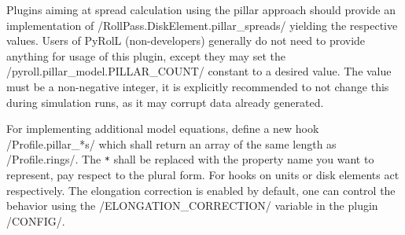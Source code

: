 \documentclass[11pt]{PyRollDocs}
\begin{document}
    Plugins aiming at spread calculation using the pillar approach should provide an implementation of \py/RollPass.DiskElement.pillar_spreads/ yielding the respective values.
    Users of PyRolL (non-developers) generally do not need to provide anything for usage of this plugin, except they may set the \py/pyroll.pillar_model.PILLAR_COUNT/ constant to a desired value.
    The value must be a non-negative integer, it is explicitly recommended to not change this during simulation runs, as it may corrupt data already generated.

    For implementing additional model equations, define a new hook \py/Profile.pillar_*s/ which shall return an array of the same length as \py/Profile.rings/.
    The \texttt{*} shall be replaced with the property name you want to represent, pay respect to the plural form.
    For hooks on units or disk elements act respectively.
    The elongation correction is enabled by default, one can control the behavior using the \py/ELONGATION_CORRECTION/ variable in the plugin \py/CONFIG/.

    \printbibliography
\end{document}
